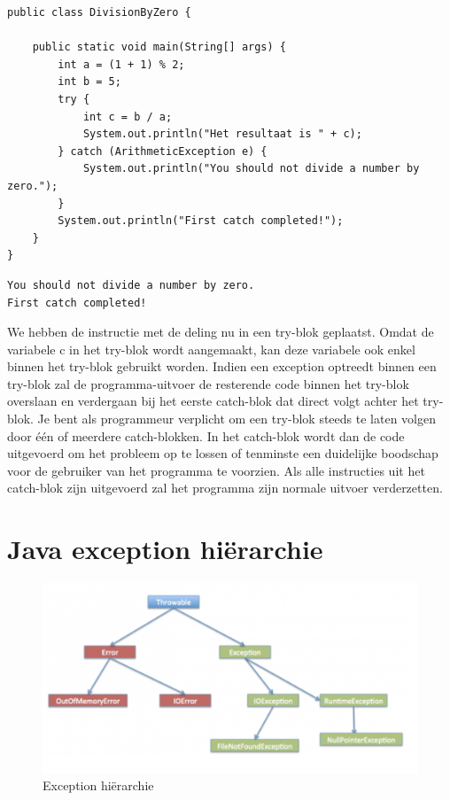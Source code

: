 \documentclass{tstextbook}
\begin{document}
\begin{lstlisting}
public class DivisionByZero {

	public static void main(String[] args) {
		int a = (1 + 1) % 2;
		int b = 5;
		try {
			int c = b / a;
			System.out.println("Het resultaat is " + c);
		} catch (ArithmeticException e) {
			System.out.println("You should not divide a number by zero.");
		}
		System.out.println("First catch completed!");
	}
}
\end{lstlisting}

\begin{verbatim}
You should not divide a number by zero.
First catch completed!
\end{verbatim}

We hebben de instructie met de deling nu in een try-blok geplaatst. Omdat de variabele c in het try-blok wordt aangemaakt, kan deze variabele ook enkel binnen het try-blok gebruikt worden. Indien een exception optreedt binnen een try-blok zal de programma-uitvoer de resterende code binnen het try-blok overslaan en verdergaan bij het eerste catch-blok dat direct volgt achter het try-blok. Je bent als programmeur verplicht om een try-blok steeds te laten volgen door \'e\'en of meerdere catch-blokken.
In het catch-blok wordt dan de code uitgevoerd om het probleem op te lossen of tenminste een duidelijke boodschap voor de gebruiker van het programma te voorzien.
Als alle instructies uit het catch-blok zijn uitgevoerd zal het programma zijn normale uitvoer verderzetten.


\section{Java exception hi\"erarchie}
  
\begin{figure}[H]
\includegraphics[width=\linewidth]{images/h1/exception-hierarchy.png}
\caption{Exception hi\"erarchie}
\label{fig:exceptiono_hierarchy}
\end{figure}
  
\end{document}
